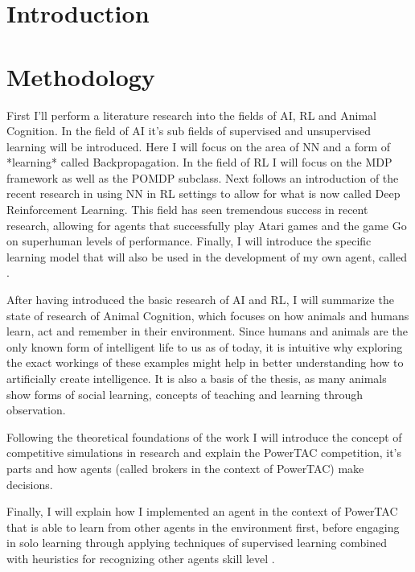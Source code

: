 \chapter{Introduction}

\chapter{Methodology}

First I'll perform a literature research into the fields of \ac{AI}, \ac{RL} and Animal Cognition. In the field of AI it's sub fields of supervised and unsupervised learning will be introduced. Here I will focus on the area of \ac{NN} and a form of *learning* called Backpropagation. In the field of \ac{RL} I will focus on the \ac{MDP} framework as well as the \ac{POMDP} subclass. 
Next follows an introduction of the recent research in using \ac{NN} in \ac{RL} settings to allow for what is now called Deep Reinforcement Learning. This field has seen tremendous success in recent research, allowing for agents that successfully play 
Atari games and the game Go on superhuman levels of performance.
Finally, I will introduce the specific learning model that will also be used in the development of my own agent, called %
.

After having introduced the basic research of \ac{AI} and \ac{RL}, I will summarize the state of research of Animal Cognition, which focuses on how animals and humans learn, act and remember in their environment. Since humans and animals are the only known form of intelligent life to us as of today, it is intuitive why exploring the exact workings of these examples might help in better understanding how to artificially create intelligence. It is also a basis of the thesis, as many animals show forms of social learning, concepts of teaching and learning through observation.

Following the theoretical foundations of the work I will introduce the concept of competitive simulations in research and explain the \ac{PowerTAC} competition, it's parts and how agents (called brokers in the context of \ac{PowerTAC}) make decisions. 

Finally, I will explain how I implemented an agent in the context of \ac{PowerTAC} that is able to learn from other agents in the environment first, before engaging in solo learning through applying techniques of supervised learning combined with heuristics for recognizing other agents skill level %
.

